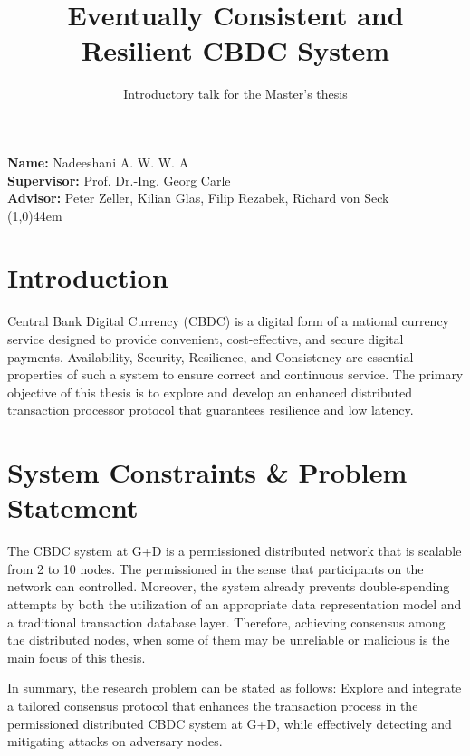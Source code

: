 \documentclass[
  english,        %
  font=times,     %
  onecolumn,      %
]{tumarticle}
\title{Eventually Consistent and Resilient CBDC System
}
\subtitle{Introductory talk for the Master’s thesis}
\author[]{}
\affil[]{}
\date{}
\begin{document}
\maketitle


\vspace{0.5em} \noindent \textcolor{TUMBlue}{ \textbf{Name:}\hspace{3em}} Nadeeshani A. W. W. A \\
\textcolor{TUMBlue}{ \textbf{Supervisor:}\hspace{0.8em}} Prof. Dr.-Ing. Georg Carle \\
\textcolor{TUMBlue}{ \textbf{Advisor:}\hspace{2.1em}} Peter Zeller, Kilian Glas, Filip Rezabek, Richard von Seck \\
{ \noindent \line(1,0){44em}}
\vspace{0.5em}

\section{Introduction}
\hspace{2em}Central Bank Digital Currency (CBDC) is a digital form of a national currency service designed to provide convenient, cost-effective, and secure digital payments.  Availability, Security, Resilience, and Consistency \cite{zhang2022blockchain} are essential properties of such a system to ensure correct and continuous service. The primary objective of this thesis is to explore and develop an enhanced distributed transaction processor protocol that guarantees resilience and low latency.

\section{System Constraints  \& Problem Statement}
\hspace{2em}The CBDC system at G+D is a permissioned distributed network that is scalable from 2 to 10 nodes. The permissioned in the sense that participants on the network can controlled. Moreover, the system already prevents double-spending attempts by both the utilization of an appropriate data representation model and a traditional transaction database layer. Therefore, achieving consensus among the distributed nodes, when some of them may be unreliable or malicious is the main focus of this thesis.

\hspace{1em}In summary, the research problem can be stated as follows: Explore and integrate a tailored consensus protocol that enhances the transaction process in the permissioned distributed CBDC system at G+D, while effectively detecting and mitigating attacks on adversary nodes.
\end{document}
